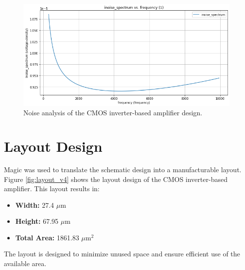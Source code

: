 \begin{figure}[ht!]
\centering
\includegraphics[width=\textwidth]{Figures/v4_noise_sim_results.png}
\caption{Noise analysis of the CMOS inverter-based amplifier design.}
\label{fig:noise_v4}
\end{figure}

\section{Layout Design}

Magic was used to translate the schematic design into a manufacturable layout. 
Figure \ref{fig:layout_v4} shows the layout design of the CMOS inverter-based amplifier. This layout results in:

\begin{itemize}
\item \textbf{Width:} 27.4 $\mu$m
\item \textbf{Height:} 67.95 $\mu$m
\item \textbf{Total Area:} 1861.83 $\mu$m$^2$
\end{itemize}

The layout is designed to minimize unused space and ensure efficient use of the available area.

